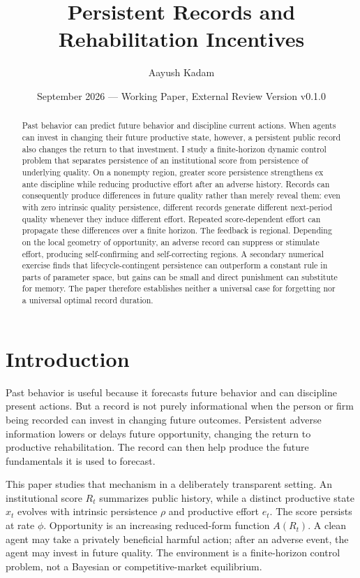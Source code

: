 \documentclass[11pt]{article}
\title{Persistent Records and Rehabilitation Incentives}
\author{Aayush Kadam}
\date{September 2026 --- Working Paper, External Review Version v0.1.0}
\begin{document}
\maketitle

\begin{abstract}
Past behavior can predict future behavior and discipline current actions. When agents can invest in changing their future productive state, however, a persistent public record also changes the return to that investment. I study a finite-horizon dynamic control problem that separates persistence of an institutional score from persistence of underlying quality. On a nonempty region, greater score persistence strengthens ex ante discipline while reducing productive effort after an adverse history. Records can consequently produce differences in future quality rather than merely reveal them: even with zero intrinsic quality persistence, different records generate different next-period quality whenever they induce different effort. Repeated score-dependent effort can propagate these differences over a finite horizon. The feedback is regional. Depending on the local geometry of opportunity, an adverse record can suppress or stimulate effort, producing self-confirming and self-correcting regions. A secondary numerical exercise finds that lifecycle-contingent persistence can outperform a constant rule in parts of parameter space, but gains can be small and direct punishment can substitute for memory. The paper therefore establishes neither a universal case for forgetting nor a universal optimal record duration.
\end{abstract}

\section{Introduction}

Past behavior is useful because it forecasts future behavior and can discipline present actions. But a record is not purely informational when the person or firm being recorded can invest in changing future outcomes. Persistent adverse information lowers or delays future opportunity, changing the return to productive rehabilitation. The record can then help produce the future fundamentals it is used to forecast.

This paper studies that mechanism in a deliberately transparent setting. An institutional score $R_t$ summarizes public history, while a distinct productive state $x_t$ evolves with intrinsic persistence $\rho$ and productive effort $e_t$. The score persists at rate $\phi$. Opportunity is an increasing reduced-form function $A(R_t)$. A clean agent may take a privately beneficial harmful action; after an adverse event, the agent may invest in future quality. The environment is a finite-horizon control problem, not a Bayesian or competitive-market equilibrium.
\end{document}
